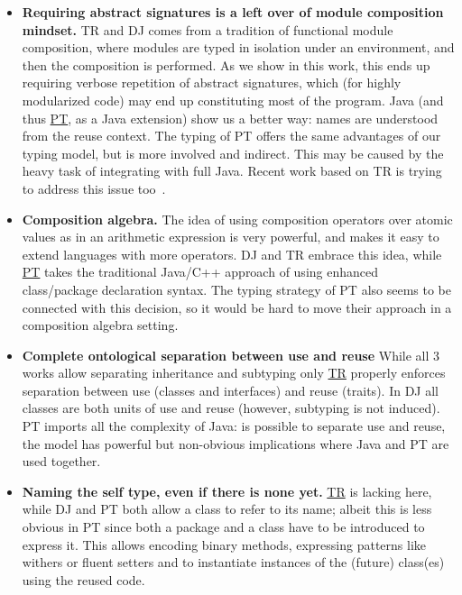 \begin{itemize}
\item 
{\bf Requiring abstract signatures is a left over of module composition mindset.}
TR and DJ comes from a tradition of functional module composition, where 
modules are typed in isolation under an environment, and then the composition is performed.
As we show in this work, this ends up requiring verbose repetition of abstract signatures,
which (for highly modularized code) may end up constituting most of the program.
Java (and thus \underline{PT}, as a Java extension) show us a better way:
names are understood from the reuse context.
The typing of PT offers the same advantages of our typing model, 
but is more involved and indirect. This may be caused by the
heavy task of integrating with full Java.
Recent work based on TR is trying to address this issue too~\cite{damiani2017unified}.
\item {\bf Composition algebra.}
The idea of using composition operators over atomic values as in an arithmetic expression is very powerful,
and makes it easy to extend languages with more operators. DJ and TR embrace this idea, while \underline{PT} takes the traditional Java/C++ approach of using enhanced class/package declaration syntax.
The typing strategy of PT also seems to be connected with this
decision, so it would be hard to move their approach in a composition
algebra setting.
\item {\bf Complete ontological separation between use and reuse}
While all 3 works allow separating inheritance and subtyping only \underline{TR} properly enforces 
separation between use (classes and interfaces) and reuse (traits).
In DJ all classes are both units of use and reuse (however, subtyping is not induced).
PT imports all the complexity of Java: is possible to separate use and reuse, the model has powerful but non-obvious implications where Java \Q@extends@ and PT are used together.
\item {\bf Naming the self type, even if there is none yet.}
\underline{TR} is lacking here, while DJ and PT both allow a class to refer to its name; albeit this is
less obvious in PT since both a package and a class have to be introduced to express it.
This allows encoding binary methods, expressing patterns like withers or fluent setters and to instantiate instances of the (future) class(es)  using the reused code.
\end{itemize}
\saveSpace
